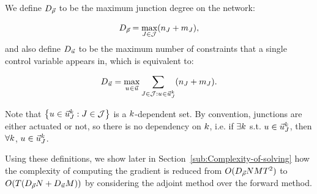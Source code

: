We define $D_{\vec{\rho}}$ to be the maximum junction degree on the network:

\begin{equation}
\DegreeSymbol{\state}=\max_{\jn\in\jns}\left(\ninc_{\jn}+\nout_{\jn}\right),\label{eq:dx}
\end{equation}
and also define $D_{\vec{u}}$ to be the maximum number of constraints
that a single control variable appears in, which is equivalent to:

\begin{equation}
\DegreeSymbol{\control}=\max_{\condiscrete{}{}\in\control}\sum_{\jn\in\jns:\condiscrete{}{}\in\junccon{\jn}{\tind}}\left(\ninc_{\jn}+\nout_{\jn}\right)\label{eq:dv}.
\end{equation}


Note that $\left\{ \convar\in\junccon{\jn}{\tind}:\jn\in\jns\right\} $
is a $k$-dependent set. By convention, junctions are either actuated
or not, so there is no dependency on $k$, i.e. if $\exists k$
s.t. $u\in\vec{u}_{J}^{k}$, then $\forall k$, $u\in\vec{u}_{J}^{k}$.

Using these definitions, we show later in Section~\ref{sub:Complexity-of-solving}
how the complexity of computing the gradient is reduced from $O(D_{\vec{\rho}}NMT^{2})$
to $O(\ntime\left(\DegreeSymbol{\state}\nlinks+\DegreeSymbol{\control}\ncontrols\right))$
by considering the adjoint method over the forward method.

